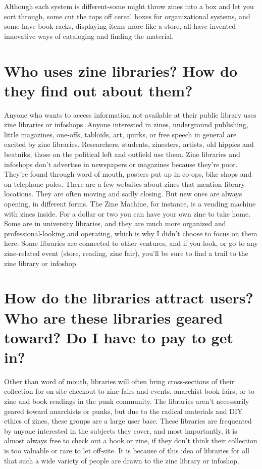 \documentclass[output=paper]{langscibook}
\begin{document}
Although each system is different-some might throw zines into a box and
let you sort through, some cut the tops off cereal boxes for
organizational systems, and some have book racks, displaying items more
like a store, all have invented innovative ways of cataloging and
finding the material.

\hypertarget{who-uses-zine-libraries-how-do-they-find-out-about-them}{%
\section{Who uses zine libraries? How do they find out about
them?}\label{who-uses-zine-libraries-how-do-they-find-out-about-them}}

Anyone who wants to access information not available at their public
library uses zine libraries or infoshops. Anyone interested in zines,
underground publishing, little magazines, one-offs, tabloids, art,
quirks, or free speech in general are excited by zine libraries.
Researchers, students, zinesters, artists, old hippies and beatniks,
those on the political left and outfield use them. Zine libraries and
infoshops don't advertise in newspapers or magazines because they're
poor. They're found through word of mouth, posters put up in co-ops,
bike shops and on telephone poles. There are a few websites about zines
that mention library locations. They are often moving and sadly closing.
But new ones are always opening, in different forms. The Zine Machine,
for instance, is a vending machine with zines inside. For a dollar or
two you can have your own zine to take home. Some are in university
libraries, and they are much more organized and professional-looking and
operating, which is why I didn't choose to focus on them here. Some
libraries are connected to other ventures, and if you look, or go to any
zine-related event (store, reading, zine fair), you'll be sure to find a
trail to the zine library or infoshop.

\hypertarget{how-do-the-libraries-attract-users-who-are-these-libraries-geared-toward-do-i-have-to-pay-to-get-in}{%
\section{How do the libraries attract users? Who are these libraries
geared toward? Do I have to pay to get
in?}\label{how-do-the-libraries-attract-users-who-are-these-libraries-geared-toward-do-i-have-to-pay-to-get-in}}

Other than word of mouth, libraries will often bring cross-sections of
their collection for on-site checkout to zine fairs and events,
anarchist book fairs, or to zine and book readings in the punk
community. The libraries aren't necessarily geared toward anarchists or
punks, but due to the radical materials and DIY ethics of zines, these
groups are a large user base. These libraries are frequented by anyone
interested in the subjects they cover, and most importantly, it is
almost always free to check out a book or zine, if they don't think
their collection is too valuable or rare to let off-site. It is because
of this idea of libraries for all that such a wide variety of people are
drawn to the zine library or infoshop.
\end{document}
